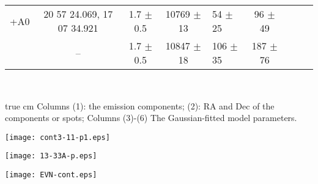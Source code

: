 \documentclass[]{aa} %
\newcommand{\kms}{km s$^{-1}$\xspace}
\begin{document}
\begin{table*}
\begin{center}
\begin{tabular}{c c c c l c c c c}
     +A0   %
             &  20 57 24.069, 17 07 34.921                        &  1.7 $\pm$ 0.5         & 10769 $\pm$ 13      & 54  $\pm$ 25      & 96 $\pm$ 49      \\
             & --                          &  1.7 $\pm$ 0.5         & 10847 $\pm$ 18      & 106 $\pm$ 35      & 187 $\pm$ 76      \\


  \hline
  \end{tabular}\\

    \end{center}
     true cm \noindent Columns (1): the emission components; (2): RA and Dec of the components or spots; Columns (3)-(6) The Gaussian-fitted model parameters.
    \end{table*}
\begin{figure*}
   \centering


\texttt{[image: cont3-11-p1.eps]}

    \caption{Multi-band radio contour maps of IIZw 096 from VLA archival data overlaid on the HST F814W(I) image}

    \label{L-Ka1}%
\end{figure*}
\addtocounter{figure}{-1}
\begin{figure*}
   \centering

\texttt{[image: 13-33A-p.eps]}
    \caption{Continued}
    \label{L-Ka2}%
\end{figure*}
\begin{figure*}
   \centering
   \texttt{[image: EVN-cont.eps]}
      \caption{The high-resolution OH 1667/1665 MHz line emission from EVN observations \textbf{of IIZw 096}. Top panels are the images of two-epoch OH 1667 MHz line emission (V $\sim$ 10750-10950 \kms), which have been restored to the same beam size. The bottom panel is a dirty image of the OH-1665 line emission (V $\sim$ 11080-11320 \kms) obtained by combining the two-epoch EVN data.
      }
      \label{EVN2line}
\end{figure*}
\end{document}
